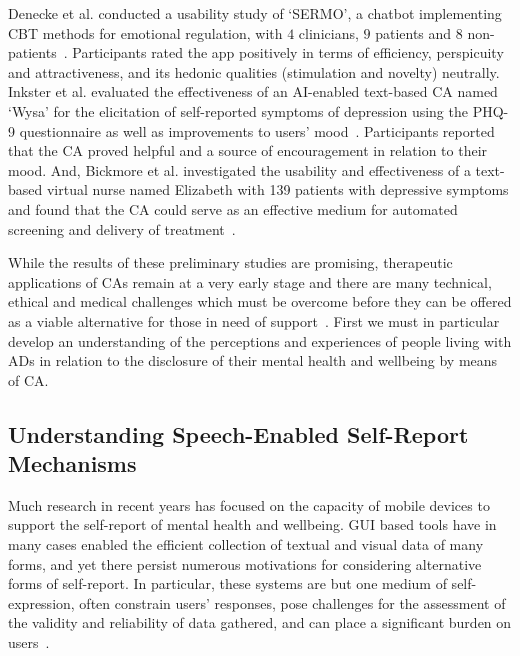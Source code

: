             Denecke et al. conducted a usability study of `SERMO', a chatbot implementing \ac{CBT} methods for emotional regulation, with $4$ clinicians, $9$ patients and $8$ non-patients~\cite{denecke2020mental}. Participants rated the app positively in terms of efficiency, perspicuity and attractiveness, and its hedonic qualities (stimulation and novelty) neutrally. Inkster et al. evaluated the effectiveness of an \ac{AI}-enabled text-based \ac{CA} named `Wysa' for the elicitation of self-reported symptoms of depression using the \ac{PHQ-9} questionnaire as well as improvements to users' mood~\cite{inkster2018empathy}. Participants reported that the \ac{CA} proved helpful and a source of encouragement in relation to their mood. And, Bickmore et al. investigated the usability and effectiveness of a text-based virtual nurse named Elizabeth with 139 patients with depressive symptoms and found that the \ac{CA} could serve as an effective medium for automated screening and delivery of treatment~\cite{bickmore2010response}.

            While the results of these preliminary studies are promising, therapeutic applications of \ac{CA}s remain at a very early stage and there are many technical, ethical and medical challenges which must be overcome before they can be offered as a viable alternative for those in need of support~\cite{vaidyam2019chatbots}. First we must in particular develop an understanding of the perceptions and experiences of people living with \ac{AD}s in relation to the disclosure of their mental health and wellbeing by means of \ac{CA}. 
            
    \subsection{Understanding Speech-Enabled Self-Report Mechanisms}
        
        Much research in recent years has focused on the capacity of mobile devices  to support the self-report of mental health and wellbeing. \ac{GUI} based tools have in many cases enabled the efficient collection of textual and visual data of many forms, and yet there persist numerous motivations for considering alternative forms of self-report. In particular, these systems are but one medium of self-expression, often constrain users' responses, pose challenges for the assessment of the validity and reliability of data gathered, and can place a significant burden on users~\cite{harari2016using, van2017experience, doherty2020design}.
        

